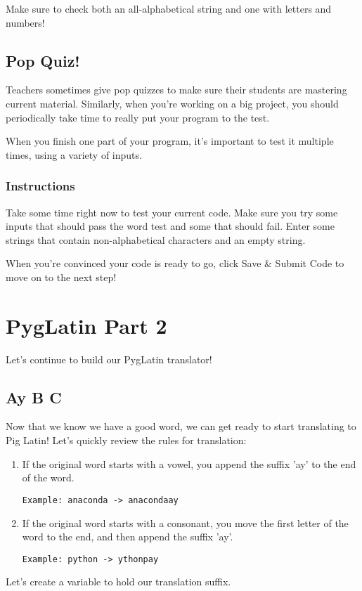 \documentclass[12pt,a4paper,final,twoside,onecolumn,titlepage]{book}
\begin{document}
Make sure to check both an all-alphabetical string and one with letters and numbers!

\subsection{Pop Quiz!}

Teachers sometimes give pop quizzes to make sure their students are mastering current material. Similarly, when you're working on a big project, you should periodically take time to really put your program to the test.

When you finish one part of your program, it's important to test it multiple times, using a variety of inputs.
\subsubsection{Instructions}

Take some time right now to test your current code. Make sure you try some inputs that should pass the word test and some that should fail. Enter some strings that contain non-alphabetical characters and an empty string.

When you're convinced your code is ready to go, click Save \& Submit Code to move on to the next step!

\section{PygLatin Part 2}
Let's continue to build our PygLatin translator!

\subsection{Ay B C}

Now that we know we have a good word, we can get ready to start translating to Pig Latin! Let's quickly review the rules for translation:
\begin{enumerate}
\item If the original word starts with a vowel, you append the suffix 'ay' to the end of the word.
\begin{lstlisting}
Example: anaconda -> anacondaay
\end{lstlisting}
\item If the original word starts with a consonant, you move the first letter of the word to the end, and then append the suffix 'ay'.
\begin{lstlisting}
Example: python -> ythonpay
\end{lstlisting}
\end{enumerate}
Let's create a variable to hold our translation suffix.
\end{document}
